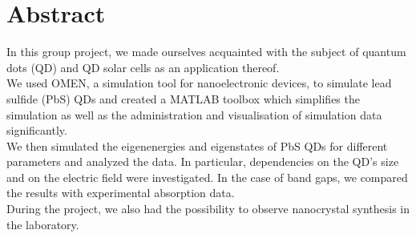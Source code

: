 \chapter*{Abstract}

In this group project, we made ourselves acquainted with the subject of quantum dots (QD) and QD solar cells as an application thereof. \\

We used OMEN, a simulation tool for nanoelectronic devices, to simulate lead sulfide (PbS) QDs and created a MATLAB toolbox which
simplifies the simulation as well as the administration and visualisation of simulation data significantly.\\

We then simulated the eigenenergies and eigenstates of PbS QDs for different parameters and analyzed the data. In particular, dependencies on the QD's size and on the electric field were investigated. In the case of band gaps, we compared the results with experimental absorption data.\\

During the project, we also had the possibility to observe nanocrystal synthesis in the laboratory.